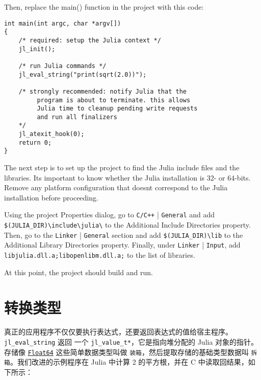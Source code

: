 Then, replace the main() function in the project with this code:




\begin{lstlisting}
int main(int argc, char *argv[])
{
    /* required: setup the Julia context */
    jl_init();

    /* run Julia commands */
    jl_eval_string("print(sqrt(2.0))");

    /* strongly recommended: notify Julia that the
         program is about to terminate. this allows
         Julia time to cleanup pending write requests
         and run all finalizers
    */
    jl_atexit_hook(0);
    return 0;
}
\end{lstlisting}



The next step is to set up the project to find the Julia include files and the libraries. It{\textquotesingle}s important to know whether the Julia installation is 32- or 64-bits. Remove any platform configuration that doesn{\textquotesingle}t correspond to the Julia installation before proceeding.



Using the project Properties dialog, go to \texttt{C/C++} | \texttt{General} and add \texttt{\$(JULIA\_DIR){\textbackslash}include{\textbackslash}julia{\textbackslash}} to the Additional Include Directories property. Then, go to the \texttt{Linker} | \texttt{General} section and add \texttt{\$(JULIA\_DIR){\textbackslash}lib} to the Additional Library Directories property. Finally, under \texttt{Linker} | \texttt{Input}, add \texttt{libjulia.dll.a;libopenlibm.dll.a;} to the list of libraries.



At this point, the project should build and run.



\hypertarget{4573294506139022977}{}


\section{转换类型}



真正的应用程序不仅仅要执行表达式，还要返回表达式的值给宿主程序。\texttt{jl\_eval\_string} 返回 一个 \texttt{jl\_value\_t*}，它是指向堆分配的 Julia 对象的指针。存储像 \hyperlink{5027751419500983000}{\texttt{Float64}} 这些简单数据类型叫做 \texttt{装箱}，然后提取存储的基础类型数据叫 \texttt{拆箱}。我们改进的示例程序在 Julia 中计算 2 的平方根，并在 C 中读取回结果，如下所示：




